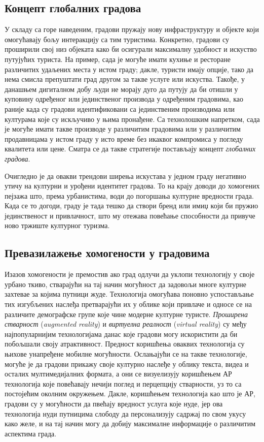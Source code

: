 \documentclass{article}
\begin{document}
\subsection{Концепт глобалних градова}
У складу са горе наведеним, градови пружају нову инфраструктуру и објекте који омогућавају бољу интеракцију са тим туристима. Конкретно, градови су проширили свој низ објеката како би осигурали максималну удобност и искуство путујућих туриста. На пример, сада је могуће имати кухиње и ресторане различитих удаљених места у истом граду; дакле, туристи имају опције, тако да нема смисла препуштати град другом за такве услуге или искуства. Такође, у данашњем дигиталном добу људи не морају дуго да путују да би отишли у куповину одређеног или јединственог производа у одређеним градовима, као раније када су градови идентификовани са јединственим производима или културама које су искључиво у њима пронађене. Са технолошким напретком, сада је могуће имати такве производе у различитим градовима или у различитим продавницама у истом граду у исто време без икаквог компромиса у погледу квалитета или цене. Сматра се да такве стратегије постављају концепт \textit{глобалних градова}.

Очигледно је да овакви трендови ширења искустава у једном граду негативно утичу на културни и урођени идентитет градова. То на крају доводи до хомогених пејзажа што, према урбанистима, води до погоршања културне вредности града. Када се то догоди, граду је тада тешко да створи бренд или имиџ који би пружио јединственост и привлачност, што му отежава повећање способности да привуче ново тржиште културног туризма.

\subsection{Превазилажење хомогености у градовима}
Изазов хомогености је премостив ако град одлучи да уклопи технологију у своје урбано ткиво, стварајући на тај начин могућност да задовољи многе културне захтевае за којима путници жуде. Технологија омогућава поновно успостављање тих изгубљених наслеђа претварајући их у облике који привлаче и односе се на различите демографске групе које чине модерне културне туристе. \textit{Проширена стварност} (\textit{augmented reality}) и \textit{виртуелна реалност} (\textit{virtual reality}) су међу најпопуларнијим технологијама данас које градови могу искористити да би побољшали своју атрактивност. Предност коришћења оваквих технологија су њихове унапређене мобилне могућности. Ослањајући се на такве технологије, могуће је да градови прикажу своје културно наслеђе у облику текста, видеа и осталих мултимедијалних формата, а они се визуелизују коришћењем АР технологија које повећавају нечији поглед и перцепцију стварности, уз то са постојећим околним окружењем. Дакле, коришћењем технологија као што је АР, градови су у могућности да пвећају вредност услуга које нуде, јер ова технологија нуди путницима слободу да персонализују садржај по свом укусу како желе, и на тај начин могу да добију максималне информације о различитим аспектима града.
\end{document}
